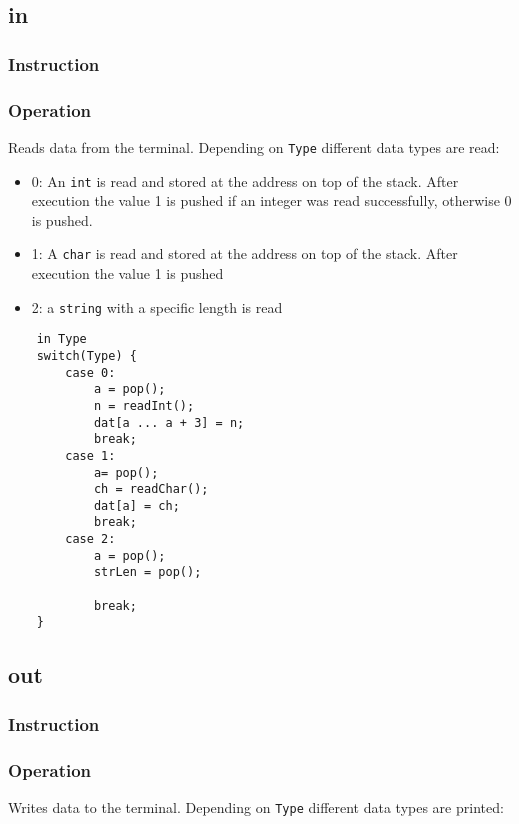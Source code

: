 \subsection{in}\label{sec:in}
\subsubsection{Instruction}

\subsubsection{Operation}
Reads data from the terminal. Depending on \lstinline$Type$ different data types are read:

\begin{itemize}
	\item 0: An \lstinline$int$ is read and stored at the address on top of the stack. After execution the value 1 is pushed if an integer was read successfully, otherwise 0 is pushed.
	\item 1: A \lstinline$char$ is read and stored at the address on top of the stack. After execution the value 1 is pushed 
	\item 2: a \lstinline$string$ with a specific length is read
\end{itemize}

	\begin{lstlisting}
	in Type
	switch(Type) {
		case 0:
			a = pop();
			n = readInt();
			dat[a ... a + 3] = n;
			break;
		case 1:
			a= pop();
			ch = readChar();
			dat[a] = ch;
			break;
		case 2:
			a = pop();
			strLen = pop();
			
			break;
	}
	\end{lstlisting}

\subsection{out}\label{sec:out}
\subsubsection{Instruction}

\subsubsection{Operation}
Writes data to the terminal. Depending on \lstinline$Type$ different data types are printed:

